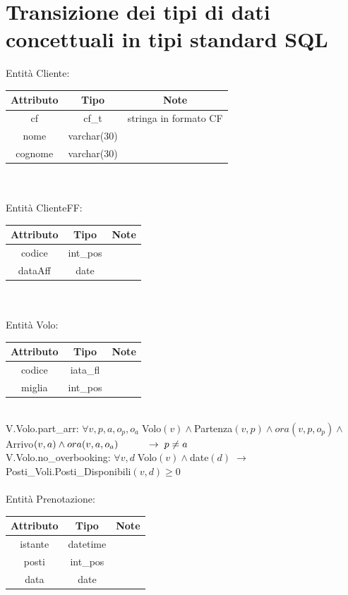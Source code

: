 \documentclass[a4paper,12pt]{report}
\begin{document}
    \chapter{Transizione dei tipi di dati concettuali in tipi standard SQL}
      Entità Cliente: \\
      \begin{tabular}{|c|c|c|}
        \hline Attributo & Tipo & Note \\
        \hline cf & cf\_t & stringa in formato CF \\
        \hline nome & varchar(30) & \\
        \hline cognome & varchar(30) & \\
        \hline
      \end{tabular} \\ \\
    Entità ClienteFF: \\
      \begin{tabular}{|c|c|c|}
        \hline Attributo & Tipo & Note \\
        \hline codice & int\_pos & \\
        \hline dataAff & date & \\
        \hline
      \end{tabular} \\ \\
      Entità Volo: \\
      \begin{tabular}{|c|c|c|}
        \hline Attributo & Tipo & Note \\
        \hline codice & iata\_fl & \\
        \hline miglia & int\_pos & \\
        \hline
      \end{tabular} \\
      V.Volo.part\_arr: $\forall v, p, a, o_p, o_a \; $Volo$(v) \wedge $Partenza$(v, p) \wedge ora(v, p, o_p) \wedge $Arrivo$(v, a) \wedge ora(v, a, o_a) \\
      \hspace*{1cm}\rightarrow\; p \neq a$ \\
      V.Volo.no\_overbooking: $\forall v, d \; $Volo$(v) \wedge $date$(d) \;\rightarrow\; $Posti\_Voli.Posti\_Disponibili$(v, d) \geq 0$ \\ \\
      Entità Prenotazione: \\
      \begin{tabular}{|c|c|c|}
        \hline Attributo & Tipo & Note \\
        \hline istante & datetime & \\
        \hline posti & int\_pos & \\
        \hline data & date & \\
        \hline
      \end{tabular} \\ \\
\end{document}
